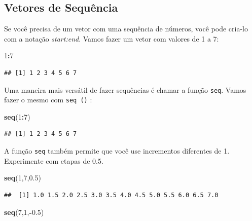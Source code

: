 \documentclass[
]{book}
\newenvironment{Shaded}{\begin{snugshade}}{\end{snugshade}}
\newcommand{\DecValTok}[1]{\textcolor[rgb]{0.00,0.00,0.81}{#1}}
\newcommand{\FloatTok}[1]{\textcolor[rgb]{0.00,0.00,0.81}{#1}}
\newcommand{\KeywordTok}[1]{\textcolor[rgb]{0.13,0.29,0.53}{\textbf{#1}}}
\newcommand{\NormalTok}[1]{#1}
\newcommand{\OperatorTok}[1]{\textcolor[rgb]{0.81,0.36,0.00}{\textbf{#1}}}
\begin{document}
\hypertarget{vetores-de-sequuxeancia}{%
\subsection{Vetores de Sequência}\label{vetores-de-sequuxeancia}}

Se você precisa de um vetor com uma sequência de números, você pode cria-lo com a notação \emph{start:end}. Vamos fazer um vetor com valores de 1 a 7:

\begin{Shaded}
\begin{Highlighting}[]
\DecValTok{1}\OperatorTok{:}\DecValTok{7}
\end{Highlighting}
\end{Shaded}

\begin{verbatim}
## [1] 1 2 3 4 5 6 7
\end{verbatim}

Uma maneira mais versátil de fazer sequências é chamar a função \texttt{seq}. Vamos fazer o mesmo com \texttt{seq\ ()} :

\begin{Shaded}
\begin{Highlighting}[]
\KeywordTok{seq}\NormalTok{(}\DecValTok{1}\OperatorTok{:}\DecValTok{7}\NormalTok{)}
\end{Highlighting}
\end{Shaded}

\begin{verbatim}
## [1] 1 2 3 4 5 6 7
\end{verbatim}

A função \texttt{seq} também permite que você use incrementos diferentes de 1. Experimente com etapas de 0.5.

\begin{Shaded}
\begin{Highlighting}[]
\KeywordTok{seq}\NormalTok{(}\DecValTok{1}\NormalTok{,}\DecValTok{7}\NormalTok{,}\FloatTok{0.5}\NormalTok{)}
\end{Highlighting}
\end{Shaded}

\begin{verbatim}
##  [1] 1.0 1.5 2.0 2.5 3.0 3.5 4.0 4.5 5.0 5.5 6.0 6.5 7.0
\end{verbatim}

\begin{Shaded}
\begin{Highlighting}[]
\KeywordTok{seq}\NormalTok{(}\DecValTok{7}\NormalTok{,}\DecValTok{1}\NormalTok{,}\OperatorTok{-}\FloatTok{0.5}\NormalTok{) }
\end{Highlighting}
\end{Shaded}
\end{document}
